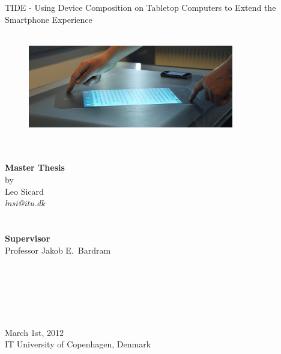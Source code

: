 \documentclass[a4paper,11pt,twoside,onecolumn,openright,final]{memoir}
\begin{document}
\pagestyle{empty}

\begin{centering}
\hfill\\
\hfill\\
\hfill\\
\hfill\\

\Huge TIDE - Using Device Composition on Tabletop Computers to Extend the Smartphone Experience
\hfill\\
\hfill\\
\begin{figure}[h!]
  \centering
    \includegraphics[width=0.8\textwidth]{images/tide314}
\end{figure}
\large
\hfill\\
\hfill\\
\textbf{Master Thesis}\\by\\Leo Sicard\\
\emph{lnsi@itu.dk}\\
\hfill\\
\hfill\\
\textbf{Supervisor}\\Professor Jakob E.\ Bardram\\
\hfill\\
\hfill\\
\hfill\\
\hfill\\
\hfill\\
\hfill\\
March 1st, 2012\\IT University of Copenhagen, Denmark\\
\end{centering}
\clearpage
\end{document}
